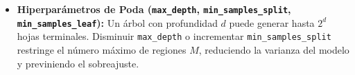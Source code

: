 \documentclass[11pt, a4paper]{article}
\begin{document}
\begin{itemize}
    \begin{equation}
        \text{OOB Score} = \frac{1}{N} \sum_{i=1}^{N} \mathbb{I}\left( y_i = \operatorname{mode}_{b \in \mathcal{B}^{(-i)}} \big\{ T_b(\mathbf{x}_i) \big\} \right)
    \end{equation}
    \item \textbf{Hiperparámetros de Poda (\texttt{max\_depth}, \texttt{min\_samples\_split}, \texttt{min\_samples\_leaf}):} Un árbol con profundidad $d$ puede generar hasta $2^d$ hojas terminales. Disminuir \texttt{max\_depth} o incrementar \texttt{min\_samples\_split} restringe el número máximo de regiones $M$, reduciendo la varianza del modelo y previniendo el sobreajuste.
\end{itemize}
\end{document}
